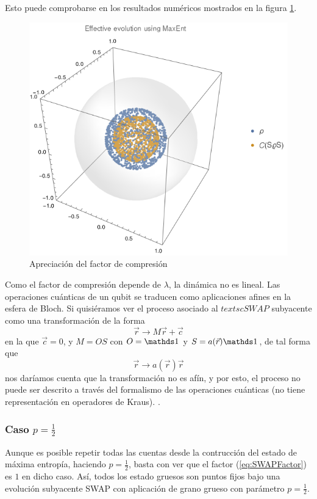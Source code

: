 Esto puede comprobarse en los resultados numéricos mostrados en la figura \ref{fig:factornnum}.
\begin{figure}[h!]
\centering
\includegraphics[width=0.6\linewidth]{maxent/figures/MaxEnt_SWAP_t0vst1_n=5000_z=0.5_p=0.3_beta=150_delta=0.6.png}
\caption{Apreciación del factor de compresión }
\label{fig:factornnum}
\end{figure}

Como el factor de compresión depende de $\lambda$, la dinámica no es lineal. Las operaciones cuánticas de un qubit se traducen como aplicaciones afines en la esfera de Bloch. Si quisiéramos ver el proceso asociado al $textsc{SWAP}$ subyacente como una transformación de la forma
\begin{equation*}
  \vec{r}\rightarrow M\vec{r}+\vec{c}
\end{equation*}
en la que $\vec{c}=0$, y $M=OS$ con $O=\Id$ y $S=a(\vec{r})\Id$, de tal forma que
\begin{equation*}
  \vec{r}\rightarrow a(\vec{r})\vec{r}
\end{equation*}
nos daríamos cuenta que la transformación no es afín, y por esto, el proceso no puede ser descrito a través del formalismo de las operaciones cuánticas (no tiene representación en operadores de Kraus). \cite{Chuang}.
\subsubsection{Caso $p=\frac{1}{2}$}

Aunque es posible repetir todas las cuentas desde la contrucción del estado de máxima entropía, haciendo $p=\frac{1}{2}$, basta con ver que el factor (\eqref{eq:SWAPFactor}) es $1$ en dicho caso. Así, todos los estado gruesos son puntos fijos bajo una evolución subyacente SWAP con aplicación de grano grueso con parámetro $p=\frac{1}{2}$.


